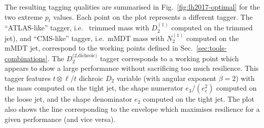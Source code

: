 %
The resulting tagging qualities are summarised in
Fig.~\ref{fig:lh2017-optimal} for the two extreme $p_t$ values.
%
Each point on the plot represents a different tagger.
%
The ``ATLAS-like'' tagger, i.e. \ trimmed mass with $D_2^{(1)}$ computed on the
trimmed jet), and ``CMS-like'' tagger, i.e.\ mMDT mass with $N_2^{(1)}$ computed on
the mMDT jet, correspond to the working points defined in
Sec.~\ref{sec:tools-combinations}.  The $D_2^\text{(2,dichroic)}$ tagger
corresponds to a working point which appears to show a large
performance without sacrificing too much resilience. This tagger features
$t\otimes \ell/t$ dichroic $D_2$ variable (with angular exponent
$\beta=2$) with the mass computed on the tight jet, the shape
numerator $e_3/(e_e^2)$ computed on the loose jet, and the shape
denominator $e_2$ computed on the tight jet.
%
The plot also shows the line corresponding to the envelope which
maximises resilience for a given performance (and vice versa).


